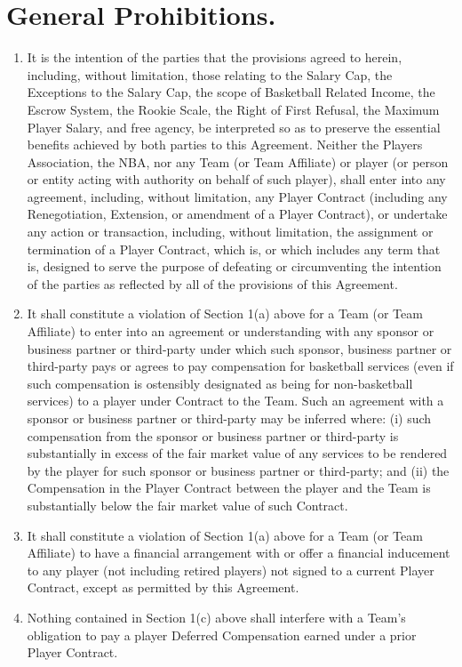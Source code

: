 \documentclass[
]{book}
\providecommand{\tightlist}{%
  \setlength{\itemsep}{0pt}\setlength{\parskip}{0pt}}
\begin{document}
\hypertarget{general-prohibitions.}{%
\section{General Prohibitions.}\label{general-prohibitions.}}

\begin{enumerate}
\def\labelenumi{(\alph{enumi})}
\tightlist
\item
  It is the intention of the parties that the provisions agreed to herein, including, without limitation, those relating to the Salary Cap, the Exceptions to the Salary Cap, the scope of Basketball Related Income, the Escrow System, the Rookie Scale, the Right of First Refusal, the Maximum Player Salary, and free agency, be interpreted so as to preserve the essential benefits achieved by both parties to this Agreement. Neither the Players Association, the NBA, nor any Team (or Team Affiliate) or player (or person or entity acting with authority on behalf of such player), shall enter into any agreement, including, without limitation, any Player Contract (including any Renegotiation, Extension, or amendment of a Player Contract), or undertake any action or transaction, including, without limitation, the assignment or termination of a Player Contract, which is, or which includes any term that is, designed to serve the purpose of defeating or circumventing the intention of the parties as reflected by all of the provisions of this Agreement.
\item
  It shall constitute a violation of Section 1(a) above for a Team (or Team Affiliate) to enter into an agreement or understanding with any sponsor or business partner or third-party under which such sponsor, business partner or third-party pays or agrees to pay compensation for basketball services (even if such compensation is ostensibly designated as being for non-basketball services) to a player under Contract to the Team. Such an agreement with a sponsor or business partner or third-party may be inferred where: (i) such compensation from the sponsor or business partner or third-party is substantially in excess of the fair market value of any services to be rendered by the player for such sponsor or business partner or third-party; and (ii) the Compensation in the Player Contract between the player and the Team is substantially below the fair market value of such Contract.
\item
  It shall constitute a violation of Section 1(a) above for a Team (or Team Affiliate) to have a financial arrangement with or offer a financial inducement to any player (not including retired players) not signed to a current Player Contract, except as permitted by this Agreement.
\item
  Nothing contained in Section 1(c) above shall interfere with a Team's obligation to pay a player Deferred Compensation earned under a prior Player Contract.
\end{enumerate}
\end{document}
